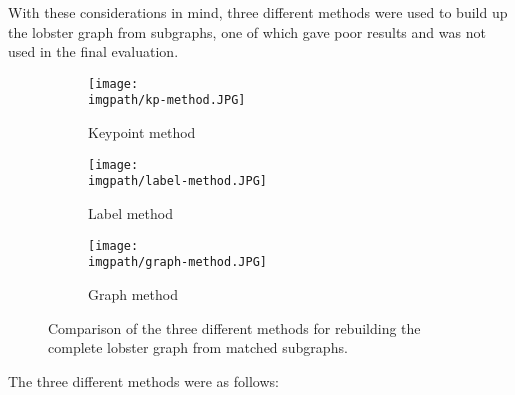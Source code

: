 \n
With these considerations in mind, three different methods were used to build up the lobster graph from subgraphs, one of which gave poor results and was not used in the final evaluation. 
\begin{figure}[H]
\centering
	\begin{subfigure}{0.32\textwidth}
	\texttt{[image: \\imgpath/kp-method.JPG]}
	\caption{Keypoint method}	
	\end{subfigure}
	\hspace*{\fill}
	\begin{subfigure}{0.32\textwidth}
	\texttt{[image: \\imgpath/label-method.JPG]}
	\caption{Label method}
	\end{subfigure}
	\hspace*{\fill}
	\begin{subfigure}{0.32\textwidth}
	\texttt{[image: \\imgpath/graph-method.JPG]}
	\caption{Graph method}
	\end{subfigure}
\caption{Comparison of the three different methods for rebuilding the complete lobster graph from matched subgraphs.}
\end{figure}
\noindent
The three different methods were as follows:
